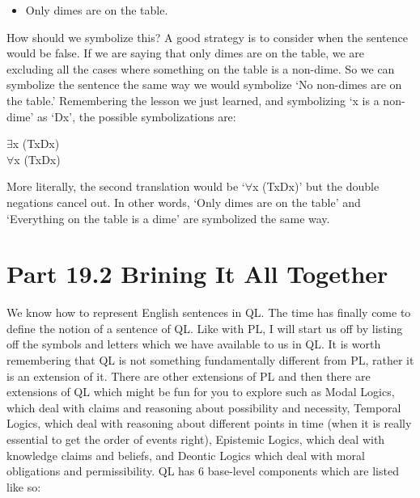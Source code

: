 \begin{itemize}
\item[\ex{coin5}]Only dimes are on the table.
\end{itemize}

How should we symbolize this? A good strategy is to consider when the sentence would be false. If we are saying that only dimes are on the table, we are excluding all the cases where something on the table is a non-dime. So we can symbolize the sentence the same way we would symbolize ‘No non-dimes are on the table.’ Remembering the lesson we just learned, and symbolizing ‘x is a non-dime’ as ‘\enot Dx’, the possible symbolizations are: 
\begin{center}
\enot $\exists$x (Tx\eand  \enot Dx)\\
$\forall$x (Tx\eif Dx)
\end{center}
More literally, the second translation would be ‘$\forall$x (Tx\eif \enot \enot Dx)' but the double negations cancel out. In other words, ‘Only dimes are on the table’ and ‘Everything on the table is a dime’ are symbolized the same way.

\ghazali

\section{Part 19.2 Brining It All Together}
We know how to represent English sentences in QL. The time has finally come to define the notion of a \gls{sentence of QL}. Like with PL, I will start us off by listing off the symbols and letters which we have available to us in QL. It is worth remembering that QL is not something fundamentally different from PL, rather it is an extension of it. There are other extensions of PL and then there are extensions of QL which might be fun for you to explore such as Modal Logics, which deal with claims and reasoning about possibility and necessity, Temporal Logics, which deal with reasoning about different points in time (when it is really essential to get the order of events right), Epistemic Logics, which deal with knowledge claims and beliefs, and Deontic Logics which deal with moral obligations and permissibility. QL has 6 base-level components which are listed like so: 

